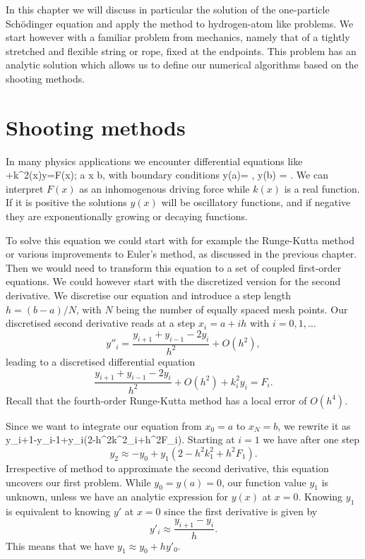 In this chapter we will discuss in particular the solution of the one-particle 
Sch\"{o}dinger equation and apply the method to hydrogen-atom like problems.
We start however with a familiar problem from mechanics, namely that of a tightly  stretched 
and flexible string or rope,
fixed at the endpoints. This problem has an analytic solution which allows us to define our
numerical algorithms based on the shooting methods. 


\section{Shooting methods}

In many physics applications we encounter 
differential equations like
\be
   +k^2(x)y=F(x); \hspace{0.1cm} a \le x \le b,
\label{eq:sch-8}
\ee
with boundary conditions
\be
  y(a)= \alpha , \hspace{0.1cm}  y(b) = \beta.
\ee
We can interpret $F(x)$ as an inhomogenous driving force while  
$k(x)$ is a real function. If it is positive the solutions $y(x)$ will be oscillatory 
functions, and if negative they are exponentionally growing or decaying functions. 

To solve this equation we could start with for example the Runge-Kutta method or various
improvements to Euler's method, as discussed in the previous chapter. Then we would need to transform
this equation to a set of coupled first-order equations. We could however start with the discretized version for the
second derivative. We discretise our equation and introduce a step length $h=(b-a)/N$, with $N$ being the 
number of equally spaced mesh points. 
Our discretised second derivative reads at a step $x_i=a+ih$ with  $i=0,1,\dots$
\[
   y''_i = \frac{y_{i+1}+y_{i-1}-2y_i}{h^2}+O(h^2),
\]
leading to a discretised differential equation
\[
   \frac{y_{i+1}+y_{i-1}-2y_i}{h^2}+O(h^2)+k^2_iy_i=F_i.
\]
Recall that the fourth-order Runge-Kutta method has a local
error of $O(h^4)$.

Since we want to integrate our equation from $x_0=a$ to $x_N=b$, we rewrite it as
\be  
   \label{eq:twopdisc1}
   y_{i+1}\approx -y_{i-1}+y_i\left(2-h^2k^2_i+h^2F_i\right).
\ee
Starting at $i=1$ we have after one step
\[
     y_{2}\approx -y_{0}+y_1\left(2-h^2k^2_1+h^2F_1\right).
\]
Irrespective of method to approximate the second derivative, 
this equation uncovers our first problem. While $y_0=y(a)=0$, our function value $y_1$ is unknown, unless
we have an analytic expression for $y(x)$ at $x=0$. Knowing $y_1$ is equivalent to
knowing $y'$ at $x=0$ since the first derivative is given by
\[
   y'_i \approx \frac{y_{i+1}-y_i}{h}. 
\]
This means that we have $y_1\approx y_0+hy'_0$. 


